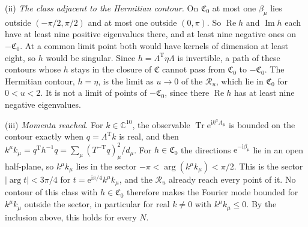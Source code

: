 (ii) \emph{The class adjacent to the Hermitian contour.} On \(\mathfrak C_0\) at most one \(\beta_\mu\) lies outside \((-\pi/2,\pi/2)\) and at most one outside \((0,\pi)\). So \(\operatorname{Re}h\) and \(\operatorname{Im}h\) each have at least nine positive eigenvalues there, and at least nine negative ones on \(-\mathfrak C_0\). At a common limit point both would have kernels of dimension at least eight, so \(h\) would be singular. Since \(h=\Lambda^{\mathrm T}\eta\Lambda\) is invertible, a path of these contours whose \(h\) stays in the closure of \(\mathfrak C\) cannot pass from \(\mathfrak C_0\) to \(-\mathfrak C_0\). The Hermitian contour, \(h=\eta\), is the limit as \(u\to0\) of the \(\mathcal R_u\), which lie in \(\mathfrak C_0\) for \(0<u<2\). It is not a limit of points of \(-\mathfrak C_0\), since there \(\operatorname{Re}h\) has at least nine negative eigenvalues.

(iii) \emph{Momenta reached.} For \(k\in\mathbb C^{10}\), the observable \(\operatorname{Tr}\mathrm e^{\mathrm ik^\mu A_\mu}\) is bounded on the contour exactly when \(q=\Lambda^{\mathrm T}k\) is real, and then \(k^\mu k_\mu=q^{\mathrm T}h^{-1}q=\sum_\mu(T^{-\mathrm T}q)_\mu^2/d_\mu\). For \(h\in\mathfrak C_0\) the directions \(\mathrm e^{-\mathrm i\beta_\mu}\) lie in an open half-plane, so \(k^\mu k_\mu\) lies in the sector \(-\pi<\arg(k^\mu k_\mu)<\pi/2\). This is the sector \(|\arg t|<3\pi/4\) for \(t=\mathrm e^{\mathrm i\pi/4}k^\mu k_\mu\), and the \(\mathcal R_u\) already reach every point of it. No contour of this class with \(h\in\mathfrak C_0\) therefore makes the Fourier mode bounded for \(k^\mu k_\mu\) outside the sector, in particular for real \(k\neq0\) with \(k^\mu k_\mu\le0\). By the inclusion above, this holds for every \(N\).

